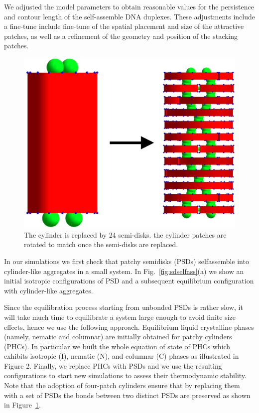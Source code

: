 \documentclass[aip,jcp, amsmath, amssymb, reprint]{revtex4-1}
\begin{document}
We adjusted the model parameters to obtain reasonable values for the persistence and contour length of the self-assemble 
DNA duplexes. These adjustments include a fine-tune include fine-tune of the spatial placement and size of 
the attractive patches, as well as a refinement of the geometry and position of the stacking patches. 

\begin{figure}[h!]
\includegraphics[width=0.7\linewidth]{sosti4.png}
\caption{\label{fig:fila} The cylinder is replaced by 24 semi-disks. the cylinder patches are rotated to match once the semi-disks are replaced.}
\end{figure}

In our simulations we first check that patchy semidisks (PSDs) selfassemble into 
cylinder-like aggregates in a small system. In Fig.~\ref{fig:sdselfass}(a) we show an initial isotropic configurations of PSD and a subsequent equilibrium 
configuration with cylinder-like aggregates. 

Since the equilibration process starting from unbonded PSDs is rather slow, 
it will take much time to equilibrate a system large enough to avoid finite size
effects, hence we use the following approach.
Equilibrium liquid crystalline phases (namely, nematic and columnar) are 
initially obtained for patchy cylinders (PHCs). 
In particular we built the whole equation of state of PHCs which exhibits
isotropic (I), nematic (N), and columnar (C) phases as illustrated in Figure 2.
Finally, we replace PHCs with PSDs and we use the resulting configurations
to start new simulations to assess their thermodynamic stability. 
Note that the adoption of four-patch cylinders ensure that by replacing
them with a set of PSDs the bonds between two distinct PSDs are preserved as shown in Figure~\ref{fig:fila}.
\end{document}
